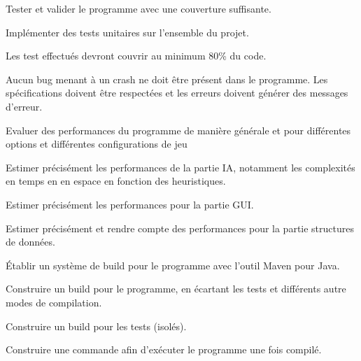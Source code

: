 \documentclass{article}
\begin{document}
\begin{nonfunctionnalneedbox}[F6. Tests]
    Tester et valider le programme avec une couverture suffisante.
    \begin{subneedbox}[F6.1 Tests]
        Implémenter des tests unitaires sur l'ensemble du projet.
    \end{subneedbox}

    \begin{subneedbox}[F6.2 Coverage]
        Les test effectués devront couvrir au minimum 80\% du code.
    \end{subneedbox}
\end{nonfunctionnalneedbox}

\begin{nonfunctionnalneedbox}[F7: Bugs]
    Aucun bug menant à un crash ne doit être présent dans le programme. Les spécifications doivent être respectées et les erreurs doivent générer des messages d'erreur.
\end{nonfunctionnalneedbox}

\begin{nonfunctionnalneedbox}[F8: Performances]
    Evaluer des performances du programme de manière générale et pour différentes options et différentes configurations de jeu
    \begin{subneedbox}[F8.1: IA]
        Estimer précisément les performances de la partie IA, notamment les complexités en temps en en espace en fonction des heuristiques.
    \end{subneedbox}
    \begin{subneedbox}[F8.1: GUI]
        Estimer précisément les performances pour la partie GUI.
    \end{subneedbox}
    \begin{subneedbox}
        Estimer précisément et rendre compte des performances pour la partie structures de données.
    \end{subneedbox}
\end{nonfunctionnalneedbox}

\begin{nonfunctionnalneedbox}
    Établir un système de build pour le programme avec l'outil Maven pour Java. 
    \begin{subneedbox}
        Construire un build pour le programme, en écartant les tests et différents autre modes de compilation.
    \end{subneedbox}
    \begin{subneedbox}[F9.2: Tests]
        Construire un build pour les tests (isolés).
    \end{subneedbox}
    \begin{subneedbox}[F9.3: Exécution]
        Construire une commande afin d'exécuter le programme une fois compilé.
    \end{subneedbox}
\end{nonfunctionnalneedbox}
\end{document}
